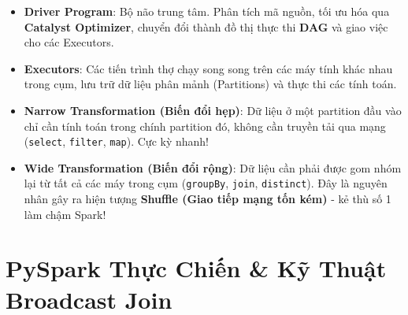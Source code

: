 \begin{lythuyetbox}
\begin{itemize}
    \item \textbf{Driver Program}: Bộ não trung tâm. Phân tích mã nguồn, tối ưu hóa qua \textbf{Catalyst Optimizer}, chuyển đổi thành đồ thị thực thi \textbf{DAG} và giao việc cho các Executors.
    \item \textbf{Executors}: Các tiến trình thợ chạy song song trên các máy tính khác nhau trong cụm, lưu trữ dữ liệu phân mảnh (Partitions) và thực thi các tính toán.
    \item \textbf{Narrow Transformation (Biến đổi hẹp)}: Dữ liệu ở một partition đầu vào chỉ cần tính toán trong chính partition đó, không cần truyền tải qua mạng (\texttt{select}, \texttt{filter}, \texttt{map}). Cực kỳ nhanh!
    \item \textbf{Wide Transformation (Biến đổi rộng)}: Dữ liệu cần phải được gom nhóm lại từ tất cả các máy trong cụm (\texttt{groupBy}, \texttt{join}, \texttt{distinct}). Đây là nguyên nhân gây ra hiện tượng \textbf{Shuffle (Giao tiếp mạng tốn kém)} - kẻ thù số 1 làm chậm Spark!
\end{itemize}
\end{lythuyetbox}

\section{PySpark Thực Chiến \& Kỹ Thuật Broadcast Join}

